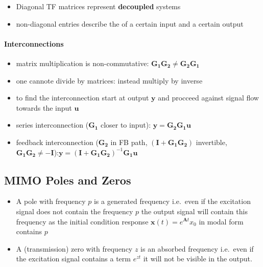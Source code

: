 \begin{itemize}
    \item Diagonal TF matrices represent \textbf{decoupled} systems
    \item non-diagonal entries describe the of a certain input and a certain output
\end{itemize}

\paragraph{Interconnections}

\begin{itemize}
    \item matrix multiplication is non-commutative: $\mathbf{G_1G_2} \ne \mathbf{G_2G_1}$
    \item one cannote divide by matrices: instead multiply by inverse
    \item to find the interconnection start at output $\mathbf{y}$ and procceed against signal flow towards the input $\mathbf{u}$
    \item series interconnection ($\mathbf{G_1}$ closer to input): $\mathbf{y}=\mathbf{G_2G_1u}$
    \item feedback interconnection ($\mathbf{G_2}$ in FB path, $(\mathbf{I}+\mathbf{G_1G_2})$ invertible, $\mathbf{G_1G_2}\ne -\mathbf{I}$):\newline $\mathbf{y}={(\mathbf{I}+\mathbf{G_1G_2})}^{-1}\mathbf{G_1u}$
\end{itemize}
\subsection{MIMO Poles and Zeros}


\begin{itemize}
    \item A pole with frequency $p$ is a generated frequency i.e.\ even if the excitation signal does not contain the frequency $p$ the output signal will contain this frequency as the initial condition response $\mathbf{x}(t)=e^{\mathbf{A}t}x_0$ in modal form contains $p$
    \item A (transmission) zero with frequency $z$ is an absorbed frequency i.e.\ even if the excitation signal contains a term $e^{zt}$ it will not be visible in the output.
\end{itemize}

